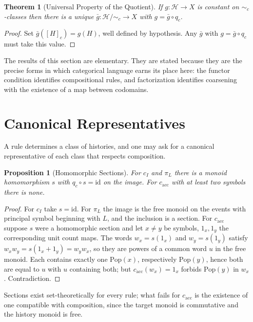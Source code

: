 \documentclass[12pt,oneside,openany]{book}
\theoremstyle{spherepop}
\newtheorem{theorem}[definition]{Theorem}
\newtheorem{proposition}[definition]{Proposition}
\theoremstyle{remarkstyle}
\newcommand{\Pop}{\mathrm{Pop}}
\newcommand{\calH}{\mathcal{H}}
\begin{document}
\begin{theorem}[Universal Property of the Quotient]
\label{thm:universal-collapse}
If $g:\calH\to X$ is constant on $\sim_c$-classes then there is a unique $\bar g:\calH/{\sim_c}\to X$ with $g=\bar g\circ q_c$.
\end{theorem}

\begin{proof}
Set $\bar g([H]_c)=g(H)$, well defined by hypothesis. Any $\bar g$ with $g=\bar g\circ q_c$ must take this value.
\end{proof}

The results of this section are elementary. They are stated because they are the precise forms in which categorical language earns its place here: the functor condition identifies compositional rules, and factorization identifies coarsening with the existence of a map between codomains.

\section{Canonical Representatives}

A rule determines a class of histories, and one may ask for a canonical representative of each class that respects composition.

\begin{proposition}[Homomorphic Sections]
\label{prop:section}
For $c_I$ and $\pi_L$ there is a monoid homomorphism $s$ with $q_c\circ s=\mathrm{id}$ on the image. For $c_{\mathrm{acc}}$ with at least two symbols there is none.
\end{proposition}

\begin{proof}
For $c_I$ take $s=\mathrm{id}$. For $\pi_L$ the image is the free monoid on the events with principal symbol beginning with $L$, and the inclusion is a section. For $c_{\mathrm{acc}}$ suppose $s$ were a homomorphic section and let $x\neq y$ be symbols, $1_x,1_y$ the corresponding unit count maps. The words $w_x=s(1_x)$ and $w_y=s(1_y)$ satisfy $w_xw_y=s(1_x+1_y)=w_yw_x$, so they are powers of a common word $u$ in the free monoid. Each contains exactly one $\Pop(x)$, respectively $\Pop(y)$, hence both are equal to $u$ with $u$ containing both; but $c_{\mathrm{acc}}(w_x)=1_x$ forbids $\Pop(y)$ in $w_x$. Contradiction.
\end{proof}

Sections exist set-theoretically for every rule; what fails for $c_{\mathrm{acc}}$ is the existence of one compatible with composition, since the target monoid is commutative and the history monoid is free.
\end{document}
